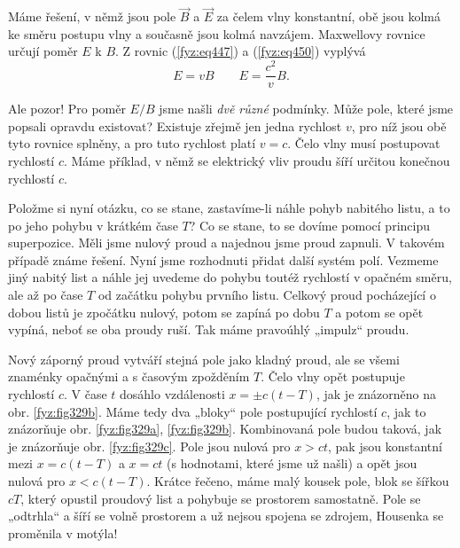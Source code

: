 {  Máme řešení, v němž jsou pole \(\vec{B}\) a \(\vec{E}\) za čelem vlny konstantní, obě jsou kolmá 
  ke směru postupu vlny a současně jsou kolmá navzájem. Maxwellovy rovnice určují poměr \(E\) k 
  \(B\). Z rovnic (\ref{fyz:eq447}) a (\ref{fyz:eq450}) vyplývá
  \begin{equation*}
    E = vB \qquad E = \frac{c^2}{v}B.
  \end{equation*}
  
  Ale pozor! Pro poměr \(E/B\) jsme našli \emph{dvě různé} podmínky. Může pole, které jsme popsali 
  opravdu existovat? Existuje zřejmě jen jedna rychlost \(v\), pro níž jsou obě tyto rovnice 
  splněny, a pro tuto rychlost platí \(v = c\). Čelo vlny musí postupovat rychlostí \(c\). Máme 
  příklad, v němž se elektrický vliv proudu šíří určitou konečnou rychlostí \(c\). 
  
  Položme si nyní otázku, co se stane, zastavíme-li náhle pohyb nabitého listu, a to po jeho pohybu 
  v krátkém čase \(T\)? Co se stane, to se dovíme pomocí principu superpozice. Měli jsme nulový 
  proud a najednou jsme proud zapnuli. V takovém případě známe řešení. Nyní jsme rozhodnuti přidat 
  další systém polí. Vezmeme jiný nabitý list a náhle jej uvedeme do pohybu toutéž rychlostí v 
  opačném směru, ale až po čase \(T\) od začátku pohybu prvního listu. Celkový proud pocházející o 
  dobou listů je zpočátku nulový, potom se zapíná po dobu \(T\) a potom se opět vypíná, neboť se 
  oba proudy ruší. Tak máme pravoúhlý „impulz“ proudu. 
  
  Nový záporný proud vytváří stejná pole jako kladný proud, ale se všemi znaménky opačnými a s 
  časovým zpožděním \(T\). Čelo vlny opět postupuje rychlostí \(c\). V čase \(t\) dosáhlo 
  vzdálenosti \(x=\pm c(t-T)\), jak je znázorněno na obr. \ref{fyz:fig329b}. Máme tedy dva „bloky“ 
  pole postupující rychlostí \(c\), jak to znázorňuje obr. \ref{fyz:fig329a}, \ref{fyz:fig329b}. 
  Kombinovaná pole budou taková, jak je znázorňuje obr. \ref{fyz:fig329c}. Pole jsou nulová pro 
  \(x>ct\), pak jsou konstantní mezi \(x = c(t - T)\) a \(x = ct\) (s hodnotami, které jsme už 
  našli) a opět jsou nulová pro \(x<c(t-T)\). Krátce řečeno, máme malý kousek pole, blok se šířkou 
  \(cT\), který opustil proudový list a pohybuje se prostorem samostatně. Pole se „odtrhla“ a šíří 
  se volně prostorem a už nejsou spojena se zdrojem, Housenka se proměnila v motýla! 
  
}
